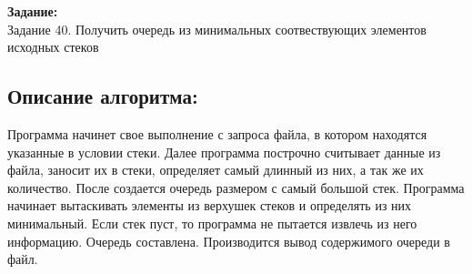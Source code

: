 \documentclass[a4paper,14pt]{extreport}
\begin{document}

\textbf{Задание:}\\
 Задание 40. Получить очередь из минимальных соотвествующих элементов исходных стеков
\subsection*{Описание алгоритма:}
    Программа начинет свое выполнение с запроса файла, в котором находятся указанные в условии стеки.
    Далее программа построчно считывает данные из файла, заносит их в стеки, определяет самый длинный из них, а так же их количество.
    После создается очередь размером с самый большой стек. 
    Программа начинает вытаскивать элементы из верхушек стеков и определять из них минимальный. Если стек пуст, то программа не пытается
    извлечь из него информацию. 
    Очередь составлена. 
    Производится вывод содержимого очереди в файл.
\end{document}
